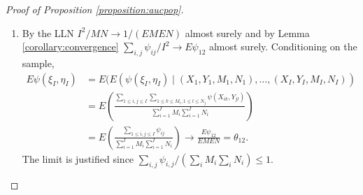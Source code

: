 \documentclass[12pt]{article}
\DeclareMathOperator{\AUC}{AUC}
\newcommand{\I}{I}
\newcommand{\E}{E}
\newcommand{\cind}{\perp \!\!\! \perp}
\newcommand{\aucpop}{\theta_{12}}%
\newcommand{\kernel}{\psi}
\newcommand{\Kernel}{\psi}
\begin{document}
  \begin{proof}[Proof of Proposition \ref{proposition:aucpop}]
    \begin{enumerate}
    \item By the LLN $\I^2/MN \to 1/(\E M\E N)$ almost surely and by Lemma \ref{corollary:convergence} $\sum_{i,j}\Kernel_{ij}/\I^2 \to \E \Kernel_{12}$ almost surely. Conditioning on the sample, 
      \begin{align}
        \E \kernel(\xi_\I,\eta_\I) &= \E( \E (\kernel(\xi_\I,\eta_\I) \mid (X_1,Y_1,M_1,N_1),\ldots,(X_\I,Y_\I,M_\I,N_\I))\\
                                   &= \E\left(\frac
                                     {\sum_{1\le i,j\le\I}\sum_{1\le k\le M_i,1\le l\le N_j}\kernel(X_{ik},Y_{jl})}
                                     {\sum_{i=1}^\I M_i \sum_{i=1}^\I N_i} \right)\\
                                   &= \E\left(\frac{\sum_{1\le i,j\le\I}\Kernel_{ij}}{\sum_{i=1}^\I M_i \sum_{i=1}^\I N_i} \right) \to \frac{\E\Kernel_{12}}{\E M \E N}=\aucpop.
      \end{align}
      The limit is justified since $\sum_{i,j}\psi_{i,j}/(\sum_i M_i\sum_i N_i)\le 1$. %


\end{enumerate}
\end{proof}
\end{document}
